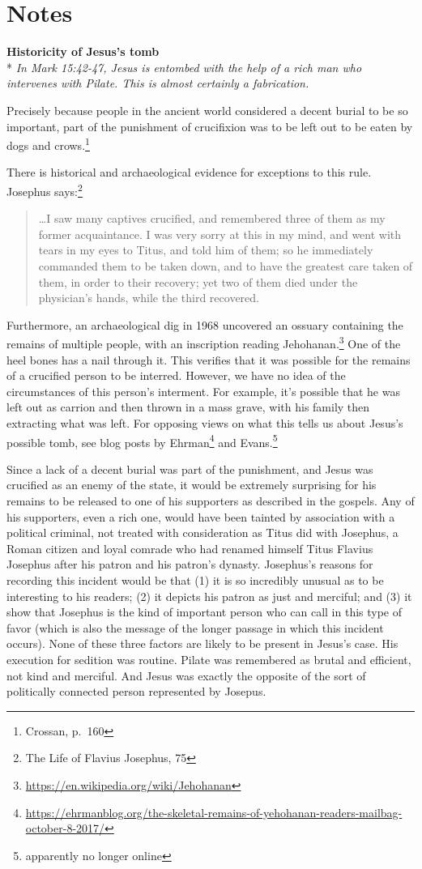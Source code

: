 \documentclass[10pt,a5paper,twoside]{article}
\newcommand{\quotesize}{\normalsize{}}
\newcommand{\maintextquotesize}{\renewcommand{\quotesize}{\large{}}}
\newcommand{\notequotesize}{\renewcommand{\quotesize}{\normalsize{}}}
\DeclareRobustCommand{\stixdangerousbend}{%
  {\usefont{U}{stixbbit}{m}{it}\symbol{"F6}}%
}
\newcommand{\dangerousbend}{\rotatebox[origin=c]{-10}{\stixdangerousbend}}
\newcommand{\link}[2]{\protect\jumplink{anchor-#1}{\textcolor{blue}{#2}}} %
\newcommand{\notetext}[2]{\textbf{\link{noteback-#1}{\dangerousbend\pageref{notebackref:#1}}\label{note:#1}\anchor{anchor-note-#1}\quad{}#2}\\*}
\newcommand{\notesummary}[1]{\emph{#1}\par}
\newenvironment{notesection}[1]{
  \setcounter{secnumdepth}{0}          %
  \section*{#1}
  \setcounter{secnumdepth}{2}          %
  \notequotesize
}%
{
  \maintextquotesize
}
\begin{document}
\begin{notesection}{Notes}
\notetext{tomb}{Historicity of Jesus's tomb}
\notesummary{In Mark 15:42-47, Jesus is entombed with the help of a rich man who intervenes with Pilate. This is almost
certainly a fabrication.}

Precisely because people in the ancient world considered a decent burial to be so important,
part of the punishment of crucifixion was to be left out to be eaten by dogs and crows.\footnote{Crossan, p.~160}

There is historical and archaeological evidence for exceptions to this rule. Josephus says:\footnote{The Life of Flavius Josephus, 75}

\begin{quote}
\ldots I saw many captives crucified, and
remembered three of them as my former acquaintance. I was very sorry at
this in my mind, and went with tears in my eyes to Titus, and told him
of them; so he immediately commanded them to be taken down, and to have
the greatest care taken of them, in order to their recovery; yet two of
them died under the physician's hands, while the third recovered.
\end{quote}


Furthermore, an archaeological dig in 1968 uncovered an ossuary containing the remains of multiple people,
with an inscription reading Jehohanan.\footnote{\url{https://en.wikipedia.org/wiki/Jehohanan}}
 One of the heel bones has a nail through it. This verifies that
it was possible for the remains of a crucified person to be interred. However, we have no idea of the
circumstances of this person's interment. For example, it's possible that he was left out as carrion and then
thrown in a mass grave, with his family then extracting what was left. For opposing views on what this tells us about Jesus's possible tomb,
see blog posts by Ehrman\footnote{\url{https://ehrmanblog.org/the-skeletal-remains-of-yehohanan-readers-mailbag-october-8-2017/}}
and Evans.\footnote{apparently no longer online}

Since a lack of a decent burial was part of the punishment, and Jesus was crucified as an enemy
of the state, it would be extremely surprising for his remains to be released to one of his supporters as described in the gospels.
Any of his supporters, even a rich one, would have been tainted by association with a political criminal,
not treated with consideration as Titus did with Josephus, a Roman citizen and loyal comrade who had renamed
himself Titus Flavius Josephus after his patron and his patron's dynasty. Josephus's reasons for recording
this incident would be that (1) it is so incredibly unusual as to be interesting to his readers;
(2) it depicts his patron as just and merciful; and
(3) it show that Josephus is the kind of important person who can call in this type of favor (which is also
the message of the longer passage in which this incident occurs).
None of these three factors are likely to be present in Jesus's case. His execution for sedition was
routine. Pilate was remembered as brutal and efficient, not kind and merciful. And Jesus was exactly
the opposite of the sort of politically connected person represented by Josepus.


\end{notesection}
\end{document}
